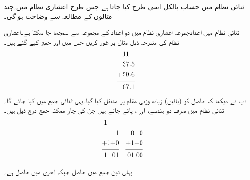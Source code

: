 	ثنائی نظام میں حساب بالکل اسی طرح کیا جاتا ہے جس طرح اعشاری نظام میں۔چند مثالوں کے مطالعہ سے  وضاحت ہو گی۔
	
	ثنائی نظام میں اعدادجموعہ اعشاری نظام میں دو اعداد کے مجموعہ سے سمجھا جا سکتا ہے۔اعشاری نظام کی مندرجہ ذیل مثال پر غور کریں جس میں  اور      جمع کیے گئے ہیں۔
\begin{align*}
\begin{split}
&11\\
&37.5\\
+&29.6\\
\noalign{\smallskip}\hline\noalign{\smallskip}
&67.1
\end{split}
\end{align*}
آپ نے دیکھا کہ    حاصل  کو  (بائیں)   زیادہ  وزنی  مقام پر منتقل کیا   گیا۔یہی    ثنائی  جمع   میں کیا جائے گا۔ ثنائی نظام میں صرف دو ہندسے،   اور ، پائے جاتے ہیں جن  کی چار ممکنہ جمع درج ذیل ہیں۔
\begin{align*}
\begin{split}
1&\\
&1\\
+&1\\
\noalign{\smallskip}\hline\noalign{\smallskip}
1&1
\end{split}&
\begin{split}
&\\
&1\\
+&0\\
\noalign{\smallskip}\hline\noalign{\smallskip}
0&1
\end{split}&
\begin{split}
&\\
&0\\
+&1\\
\noalign{\smallskip}\hline\noalign{\smallskip}
0&1
\end{split}&
\begin{split}
&\\
&0\\
+&0\\
\noalign{\smallskip}\hline\noalign{\smallskip}
0&0
\end{split}
\end{align*}


پہلی تین جمع   میں حاصل   جبکہ آخری میں حاصل   ہے۔

